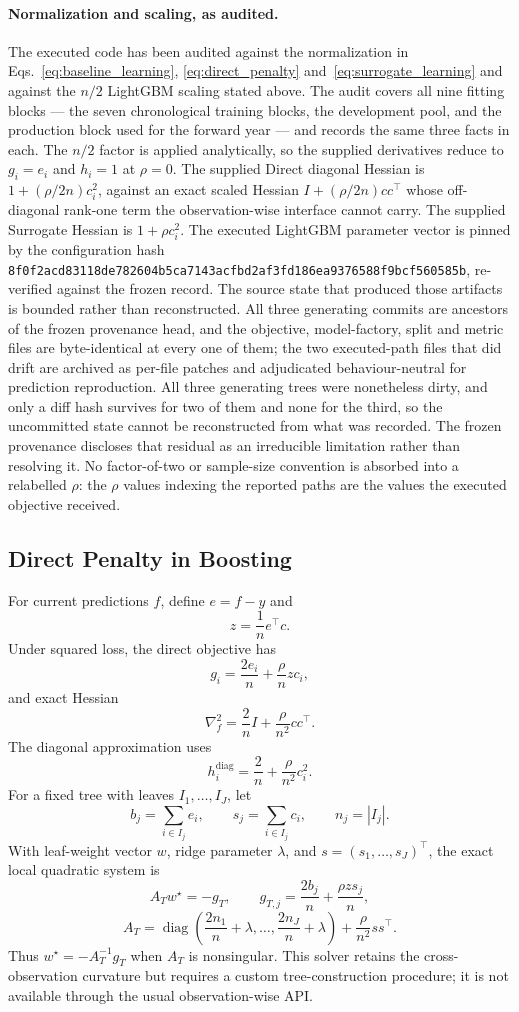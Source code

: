 \documentclass[10pt]{article}
\theoremstyle{definition}
\newcommand{\diag}{\operatorname{diag}}
\newcommand{\1}{\mathbf{1}}
\begin{document}
\paragraph{Normalization and scaling, as audited.} The executed code has been audited
against the normalization in Eqs.~\eqref{eq:baseline_learning}, \eqref{eq:direct_penalty}
and~\eqref{eq:surrogate_learning} and against the $n/2$ LightGBM scaling stated above. The audit
covers all nine fitting blocks --- the seven chronological training blocks, the development
pool, and the production block used for the forward year --- and records the same three facts in
each. The $n/2$ factor is applied analytically, so the supplied derivatives reduce to $g_i=e_i$ and
$h_i=1$ at $\rho=0$. The supplied Direct diagonal Hessian is $1+(\rho/2n)c_i^2$, against an exact
scaled Hessian $I+(\rho/2n)cc^{\top}$ whose off-diagonal rank-one term the observation-wise
interface cannot carry. The supplied Surrogate Hessian is $1+\rho c_i^2$. The executed LightGBM
parameter vector is pinned by the configuration hash
\texttt{\small 8f0f2acd83118de782604b5ca7143acfbd2af3fd186ea9376588f9bcf560585b}, re-verified against
the frozen record. The source state that produced those artifacts is bounded rather than
reconstructed. All three generating commits are ancestors of the frozen provenance head, and the
objective, model-factory, split and metric files are byte-identical at every one of them; the two
executed-path files that did drift are archived as per-file patches and adjudicated
behaviour-neutral for prediction reproduction. All three generating trees were nonetheless dirty,
and only a diff hash survives for two of them and none for the third, so the uncommitted state
cannot be reconstructed from what was recorded. The frozen provenance discloses that residual as an
irreducible limitation rather than resolving it. No factor-of-two or sample-size convention is absorbed into
a relabelled $\rho$: the $\rho$ values indexing the reported paths are the values the executed
objective received.

\subsection{Direct Penalty in Boosting}

For current predictions $f$, define $e=f-y$ and
\[
z=\frac{1}{n}e^\top c.
\]
Under squared loss, the direct objective has
\[
g_i=\frac{2e_i}{n}+\frac{\rho}{n}zc_i,
\]
and exact Hessian
\[
\nabla_f^2
=
\frac{2}{n}I+\frac{\rho}{n^2}cc^\top.
\]
The diagonal approximation uses
\[
h_i^{\mathrm{diag}}
=
\frac{2}{n}+\frac{\rho}{n^2}c_i^2.
\]
For a fixed tree with leaves $I_1,\ldots,I_J$, let
\[
b_j=\sum_{i\in I_j}e_i,
\qquad
s_j=\sum_{i\in I_j}c_i,
\qquad
n_j=|I_j|.
\]
With leaf-weight vector $w$, ridge parameter $\lambda$, and $s=(s_1,\ldots,s_J)^\top$, the exact local quadratic system is
\[
A_Tw^\star=-g_T,
\qquad
g_{T,j}=\frac{2b_j}{n}+\frac{\rho z s_j}{n},
\]
\[
A_T
=
\diag\!\left(\frac{2n_1}{n}+\lambda,\ldots,\frac{2n_J}{n}+\lambda\right)
+\frac{\rho}{n^2}ss^\top.
\]
Thus $w^\star=-A_T^{-1}g_T$ when $A_T$ is nonsingular. This solver retains the cross-observation curvature but requires a custom tree-construction procedure; it is not available through the usual observation-wise API.
\end{document}
